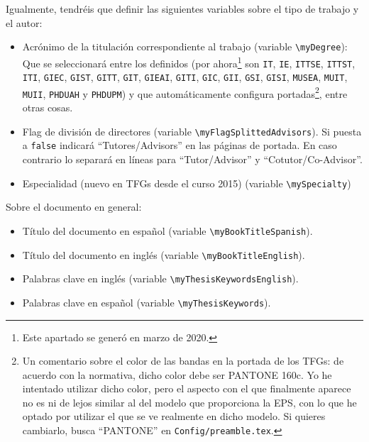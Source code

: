 \documentclass[spanish,openright]{book}
\begin{document}
Igualmente, tendréis que definir las siguientes variables sobre el tipo
de trabajo y el autor:

\begin{itemize}
\item Acrónimo de la titulación correspondiente al trabajo (variable
\texttt{\textbackslash{}myDegree}): Que se seleccionará entre los
definidos (por ahora\footnote{Este apartado se generó en marzo de
2020.} son \texttt{IT}, \texttt{IE}, \texttt{ITTSE}, \texttt{ITTST},
\texttt{ITI}, \texttt{GIEC}, \texttt{GIST}, \texttt{GITT},
\texttt{GIT}, \texttt{GIEAI}, \texttt{GITI}, \texttt{GIC},
\texttt{GII}, \texttt{GSI}, \texttt{GISI}, \texttt{MUSEA},
\texttt{MUIT}, \texttt{MUII}, \texttt{PHDUAH} y \texttt{PHDUPM}) y que
automáticamente configura portadas\footnote{Un comentario sobre el
color de las bandas en la portada de los TFGs: de acuerdo con la
normativa, dicho color debe ser PANTONE 160c. Yo he intentado
utilizar dicho color, pero el aspecto con el que finalmente aparece
no es ni de lejos similar al del modelo que proporciona la EPS, con
lo que he optado por utilizar el que se ve realmente en dicho
modelo. Si quieres cambiarlo, busca ``PANTONE'' en
\texttt{Config/preamble.tex}.}, entre otras cosas.

\item Flag de división de directores (variable
\texttt{\textbackslash{}myFlagSplittedAdvisors}). Si puesta a
\texttt{false} indicará ``Tutores/Advisors'' en las páginas de
portada. En caso contrario lo separará en líneas para
``Tutor/Advisor'' y ``Cotutor/Co-Advisor''.

\item Especialidad (nuevo en TFGs desde el curso 2015) (variable
\texttt{\textbackslash{}mySpecialty})

\end{itemize}

Sobre el documento en general:

\begin{itemize}
\item Título del documento en español (variable
\texttt{\textbackslash{}myBookTitleSpanish}).
\item Título del documento en inglés (variable
\texttt{\textbackslash{}myBookTitleEnglish}).
\item Palabras clave en inglés (variable \texttt{\textbackslash{}myThesisKeywordsEnglish}).
\item Palabras clave en español (variable \texttt{\textbackslash{}myThesisKeywords}).


\end{itemize}
\end{document}
